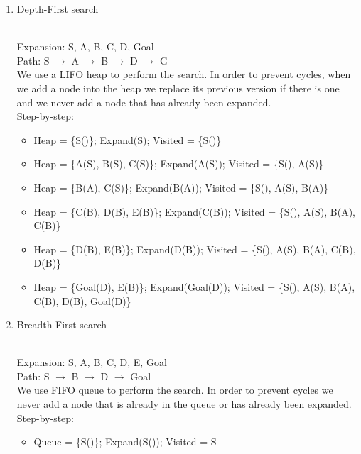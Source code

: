 \documentclass[9pt,a4paper]{extarticle}
\newenvironment{solution}
    {%
    \color{red}
    }
    { 
    \color{black}
    }
\begin{document}
    \begin{enumerate}
        \item Depth-First search
        \begin{solution}
        \\
        Expansion: S, A, B, C, D, Goal \\
        Path: S $\rightarrow$ A $\rightarrow$ B $\rightarrow$ D $\rightarrow$ G \\
        We use a LIFO heap to perform the search. In order to prevent cycles, when we add a node into the heap we replace its previous version if there is one and we never add a node that has already been expanded.\\
        Step-by-step:
        \begin{itemize}
            \item Heap = \{S()\}; Expand(S); Visited = \{S()\}
            \item Heap = \{A(S), B(S), C(S)\}; Expand(A(S)); Visited = \{S(), A(S)\}
            \item Heap = \{B(A), C(S)\}; Expand(B(A)); Visited = \{S(), A(S), B(A)\}
            \item Heap = \{C(B), D(B), E(B)\}; Expand(C(B));  Visited = \{S(), A(S), B(A), C(B)\}
            \item Heap = \{D(B), E(B)\}; Expand(D(B)); Visited = \{S(), A(S), B(A), C(B), D(B)\}
            \item Heap = \{Goal(D), E(B)\}; Expand(Goal(D)); Visited = \{S(), A(S), B(A), C(B), D(B), Goal(D)\}
        \end{itemize}
        \end{solution}
        \item Breadth-First search
        \begin{solution}
        \\
        Expansion: S, A, B, C, D, E, Goal \\
        Path: S $\rightarrow$ B $\rightarrow$ D $\rightarrow$ Goal \\
        We use FIFO queue to perform the search. In order to prevent cycles we never add a node that is already in the queue or has already been expanded.\\
        Step-by-step:
        \begin{itemize}
            \item Queue = \{S()\}; Expand(S()); Visited = S

\end{itemize}
\end{solution}
\end{enumerate}
\end{document}
